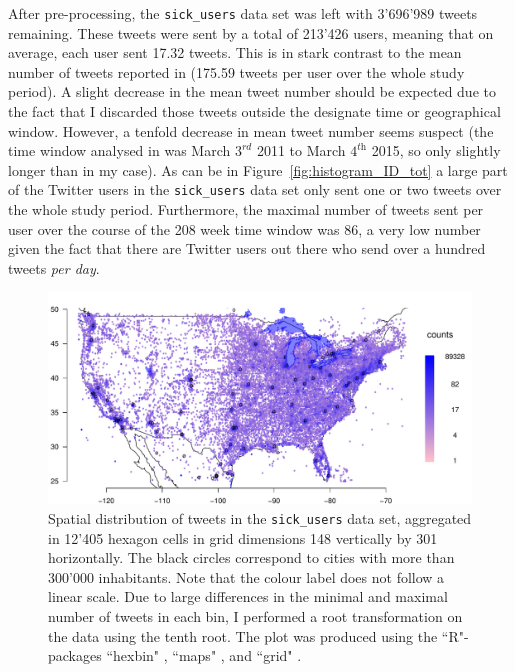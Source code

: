 \documentclass[11pt, a4paper,twoside]{report}\usepackage[]{graphicx}\usepackage[]{color}
\begin{document}
After pre-processing, the \texttt{sick\_users} data set was left with 3'696'989 tweets remaining. These tweets were sent by a total of 213'426 users, meaning that on average, each user sent 17.32 tweets. This is in stark contrast to the mean number of tweets reported in \cite{bodnar_data_2015} (175.59 tweets per user over the whole study period). A slight decrease in the mean tweet number should be expected due to the fact that I discarded those tweets outside the designate time or geographical window. However, a tenfold decrease in mean tweet number seems suspect (the time window analysed in \cite{bodnar_data_2015} was March $3^\textit{rd}$ 2011 to March $4^\textit{th}$ 2015, so only slightly longer than in my case). As can be in Figure~\ref{fig:histogram_ID_tot} a large part of the Twitter users in the \texttt{sick\_users} data set only sent one or two tweets over the whole study period. Furthermore, the maximal number of tweets sent per user over the course of the 208 week time window was 86, a very low number given the fact that there are Twitter users out there who send over a hundred tweets \textit{per day}.

\begin{figure}[htbp!]
  \centering
    \includegraphics[width=1\textwidth]{4A_HexbinContinent.pdf}
  \caption{Spatial distribution of tweets in the \texttt{sick\_users} data set, aggregated in 12'405 hexagon cells in grid dimensions 148 vertically by 301 horizontally. The black circles correspond to cities with more than 300'000 inhabitants. Note that the colour label does not follow a linear scale. Due to large differences in the minimal and maximal number of tweets in each bin, I performed a root transformation on the data using the tenth root. The plot was produced using the ``R"-packages ``hexbin" \citep{hexbin_2016}, ``maps" \citep{maps_2016}, and ``grid" \cite{rbase_2017}.}
  \label{fig:hexbincontinent}
  \end{figure}
\end{document}
